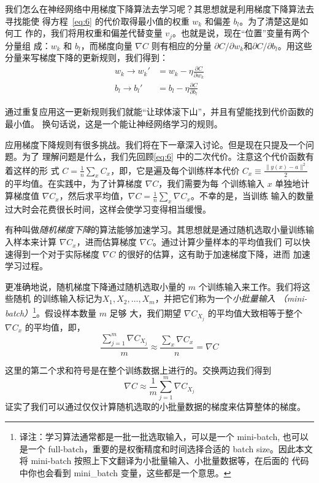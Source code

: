 我们怎么在神经网络中用梯度下降算法去学习呢？其思想就是利用梯度下降算法去寻找能使
得方程~\eqref{eq:6} 的代价取得最小值的权重 $w_k$ 和偏差 $b_l$。为了清楚这是如何工
作的，我们将用权重和偏差代替变量 $v_j$。也就是说，现在``位置''变量有两个分量组
成：$w_k$ 和 $b_l$，而梯度向量 $\nabla C$ 则有相应的分量 $\partial C / \partial
w_k$和$\partial C / \partial b_l$。用这些分量来写梯度下降的更新规则，我们得到：
\begin{align}
  \label{eq:16}w_k \rightarrow w_k' &= w_k-\eta \frac{\partial C}{\partial w_k}\tag{16}\\
  \label{eq:17}b_l \rightarrow b_l' &= b_l-\eta \frac{\partial C}{\partial b_l}\tag{17}
\end{align}

通过重复应用这一更新规则我们就能``让球体滚下山''，并且有望能找到代价函数的最小值。
换句话说，这是一个能让神经网络学习的规则。

应用梯度下降规则有很多挑战。我们将在下一章深入讨论。但是现在只提及一个问题。为了
理解问题是什么，我们先回顾\eqref{eq:6} 中的二次代价。注意这个代价函数有着这样的形
式 $C = \frac{1}{n} \sum_x C_x$，即，它是遍及每个训练样本代价 $C_x \equiv
\frac{\|y(x)-a\|^2}{2}$ 的平均值。在实践中，为了计算梯度 $\nabla C$，我们需要为每
个训练输入 $x$ 单独地计算梯度值 $\nabla
C_x$，然后求平均值，$\nabla C = \frac{1}{n} \sum_x \nabla C_x$。不幸的是，当训练
输入的数量过大时会花费很长时间，这样会使学习变得相当缓慢。

有种叫做\emph{随机梯度下降}的算法能够加速学习。其思想就是通过随机选取小量训练输
入样本来计算 $\nabla C_x$，进而估算梯度 $\nabla C$。通过计算少量样本的平均值我们
可以快速得到一个对于实际梯度 $\nabla C$ 的很好的估算，这有助于加速梯度下降，进而
加速学习过程。

更准确地说，随机梯度下降通过随机选取小量的 $m$ 个训练输入来工作。我们将这些随机
的训练输入标记为$X_1, X_2, \ldots, X_m$，并把它们称为一个\emph{小批量输入
  （mini-batch）}\footnote{译注：学习算法通常都是一批一批选取输入，可以是一个
  mini-batch, 也可以是一个 full-batch，重要的是权衡精度和时间选择合适的 batch
  size。因此本文将 mini-batch 按照上下文翻译为小批量输入、小批量数据等，在后面的
  代码中你也会看到 mini\_batch 变量，这些都是一个意思。}。假设样本数量 $m$ 足够
大，我们期望 $\nabla C_{X_j}$ 的平均值大致相等于整个 $\nabla C_x$ 的平均值，即，
\begin{equation}
  \frac{\sum_{j=1}^m \nabla C_{X_{j}}}{m} \approx \frac{\sum_x \nabla C_x}{n} = \nabla C
  \label{eq:18}\tag{18}
\end{equation}

这里的第二个求和符号是在整个训练数据上进行的。交换两边我们得到
\begin{equation}
  \nabla C \approx \frac{1}{m} \sum_{j=1}^m \nabla C_{X_{j}}
  \label{eq:19}\tag{19}
\end{equation}
证实了我们可以通过仅仅计算随机选取的小批量数据的梯度来估算整体的梯度。

